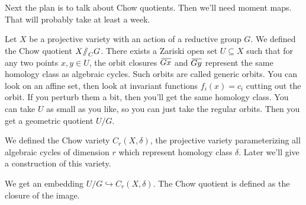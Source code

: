
Next the plan is to talk about Chow quotients. Then we'll need moment maps. That will probably take at least a week.

Let $X$ be a projective variety with an action of a reductive group $G$. We defined the Chow quotient $X\mbox{\rm /\!\!/}_C G$. There exists a Zariski open set $U\subseteq X$ such that for any two points $x,y\in U$, the orbit closures $\bbar{Gx}$ and $\bbar{Gy}$ represent the same homology class as algebraic cycles. Such orbits are called generic orbits. You can look on an affine set, then look at invariant functions $f_i(x)=c_i$ cutting out the orbit. If you perturb them a bit, then you'll get the same homology class. You can take $U$ as small as you like, so you can just take the regular orbits. Then you get a geometric quotient $U/G$. 

We defined the Chow variety $C_r(X,\delta)$, the projective variety parameterizing all algebraic cycles of dimension $r$ which represent homology class $\delta$. Later we'll give a construction of this variety.

We get an embedding $U/G\hookrightarrow C_r(X,\delta)$. The Chow quotient is defined as the closure of the image. 

